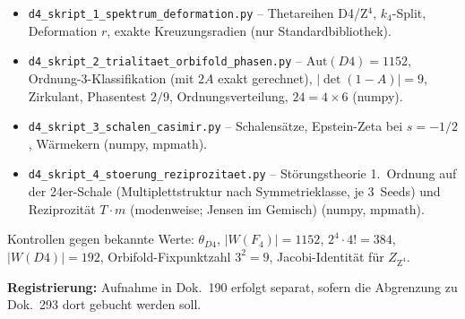 \documentclass[11pt]{report}
\begin{document}
\begin{itemize}
  \item \texttt{d4\_skript\_1\_spektrum\_deformation.py} --
        Thetareihen D4/Z$^4$, $k_4$-Split, Deformation $r$, exakte
        Kreuzungsradien (nur Standardbibliothek).
  \item \texttt{d4\_skript\_2\_trialitaet\_orbifold\_phasen.py} --
        $\text{Aut}(D4) = 1152$, Ordnung-3-Klassifikation (mit $2A$
        exakt gerechnet), $|\det(1-A)| = 9$, Zirkulant, Phasentest
        $2/9$, Ordnungsverteilung, $24 = 4\times6$ (numpy).
  \item \texttt{d4\_skript\_3\_schalen\_casimir.py} --
        Schalensätze, Epstein-Zeta bei $s = -1/2$, Wärmekern
        (numpy, mpmath).
  \item \texttt{d4\_skript\_4\_stoerung\_reziprozitaet.py} --
        Störungstheorie 1.~Ordnung auf der 24er-Schale
        (Multiplettstruktur nach Symmetrieklasse, je 3~Seeds) und
        Reziprozität $T\cdot m$ (modenweise; Jensen im Gemisch)
        (numpy, mpmath).
\end{itemize}

Kontrollen gegen bekannte Werte: $\theta_{D4}$,
$|W(F_4)| = 1152$, $2^4\cdot4! = 384$, $|W(D4)| = 192$,
Orbifold-Fixpunktzahl $3^2 = 9$, Jacobi-Identität für
$Z_{\text{Z}^4}$.

\medskip
\noindent\textbf{Registrierung:} Aufnahme in Dok.~190 erfolgt
separat, sofern die Abgrenzung zu Dok.~293 dort gebucht werden soll.
\end{document}
